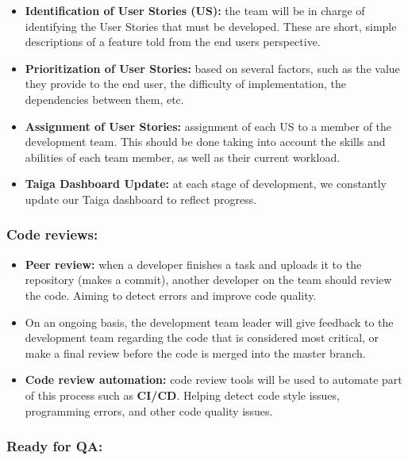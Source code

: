 \documentclass{article}
\providecommand{\tightlist}{
  \setlength{\itemsep}{0pt}\setlength{\parskip}{0pt}}
\begin{document}
\begin{itemize}
\tightlist
\item
  \textbf{Identification of User Stories (US):} the team will be in
  charge of identifying the User Stories that must be developed. These
  are short, simple descriptions of a feature told from the end
  user\textquotesingle s perspective.
\item
  \textbf{Prioritization of User Stories:} based on several factors,
  such as the value they provide to the end user, the difficulty of
  implementation, the dependencies between them, etc.
\item
  \textbf{Assignment of User Stories:} assignment of each US to a member
  of the development team. This should be done taking into account the
  skills and abilities of each team member, as well as their current
  workload.
\item
  \textbf{Taiga Dashboard Update:} at each stage of development, we
  constantly update our Taiga dashboard to reflect progress.
\end{itemize}

\hypertarget{codereviewsnbsp}{
\subsubsection{Code reviews:~}\label{codereviewsnbsp}}

\begin{itemize}
\tightlist
\item
  \textbf{Peer review:} when a developer finishes a task and uploads it
  to the repository (makes a commit), another developer on the team
  should review the code. Aiming to detect errors and improve code
  quality.
\item
  On an ongoing basis, the development team leader will give feedback to
  the development team regarding the code that is considered most
  critical, or make a final review before the code is merged into the
  master branch.
\item
  \textbf{Code review automation:} code review tools will be used to
  automate part of this process such as \textbf{CI/CD}. Helping detect
  code style issues, programming errors, and other code quality issues.
\end{itemize}

\hypertarget{readyforqa}{
\subsubsection{Ready for QA:}\label{readyforqa}}
\end{document}
